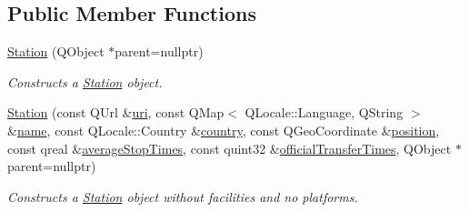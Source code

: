 \subsection*{Public Member Functions}
\begin{DoxyCompactItemize}
\item 
\mbox{\hyperlink{classQRail_1_1StationEngine_1_1Station_afbe822d31945d09250bcc8c7a1fcc4e7}{Station}} (Q\+Object $\ast$parent=nullptr)
\begin{DoxyCompactList}\small\item\em Constructs a \mbox{\hyperlink{classQRail_1_1StationEngine_1_1Station}{Station}} object. \end{DoxyCompactList}\item 
\mbox{\hyperlink{classQRail_1_1StationEngine_1_1Station_a195e36d67dbdb5695ef86e02c91b47b0}{Station}} (const Q\+Url \&\mbox{\hyperlink{classQRail_1_1StationEngine_1_1Station_a7ccf866501e2f547935c152b67d192f6}{uri}}, const Q\+Map$<$ Q\+Locale\+::\+Language, Q\+String $>$ \&\mbox{\hyperlink{classQRail_1_1StationEngine_1_1Station_a8c1f3e4a33f26db9f6ca31798b115338}{name}}, const Q\+Locale\+::\+Country \&\mbox{\hyperlink{classQRail_1_1StationEngine_1_1Station_a07e74b4f39a2fc67d20243a39226f0db}{country}}, const Q\+Geo\+Coordinate \&\mbox{\hyperlink{classQRail_1_1StationEngine_1_1Station_a139e180c6a82519db7b4b6249aa4b353}{position}}, const qreal \&\mbox{\hyperlink{classQRail_1_1StationEngine_1_1Station_a4747748868a77baad4dd01daac657fcf}{average\+Stop\+Times}}, const quint32 \&\mbox{\hyperlink{classQRail_1_1StationEngine_1_1Station_ad58620e2c5bf189e819165464d456d61}{official\+Transfer\+Times}}, Q\+Object $\ast$parent=nullptr)
\begin{DoxyCompactList}\small\item\em Constructs a \mbox{\hyperlink{classQRail_1_1StationEngine_1_1Station}{Station}} object without facilities and no platforms. \end{DoxyCompactList}\item 

\end{DoxyCompactItemize}

